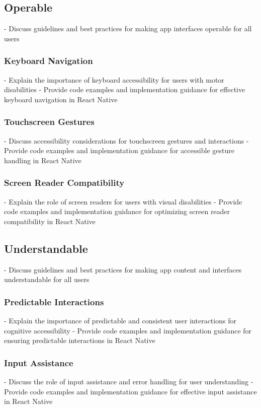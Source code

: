\subsection{Operable}
- Discuss guidelines and best practices for making app interfaces operable for all users

\subsubsection{Keyboard Navigation}
- Explain the importance of keyboard accessibility for users with motor disabilities
- Provide code examples and implementation guidance for effective keyboard navigation in React Native

\subsubsection{Touchscreen Gestures}
- Discuss accessibility considerations for touchscreen gestures and interactions
- Provide code examples and implementation guidance for accessible gesture handling in React Native

\subsubsection{Screen Reader Compatibility}
- Explain the role of screen readers for users with visual disabilities
- Provide code examples and implementation guidance for optimizing screen reader compatibility in React Native

\subsection{Understandable}
- Discuss guidelines and best practices for making app content and interfaces understandable for all users

\subsubsection{Predictable Interactions}
- Explain the importance of predictable and consistent user interactions for cognitive accessibility
- Provide code examples and implementation guidance for ensuring predictable interactions in React Native

\subsubsection{Input Assistance}
- Discuss the role of input assistance and error handling for user understanding
- Provide code examples and implementation guidance for effective input assistance in React Native


